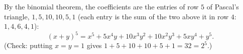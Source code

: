 By the binomial theorem, the coefficients are the entries of row $5$ of Pascal's triangle, $1,5,10,10,5,1$ (each entry is the sum of the two above it in row $4$: $1,4,6,4,1$):
\[(x+y)^5=\boxed{x^5+5x^4y+10x^3y^2+10x^2y^3+5xy^4+y^5}.\]
(Check: putting $x=y=1$ gives $1+5+10+10+5+1=32=2^5$.)
